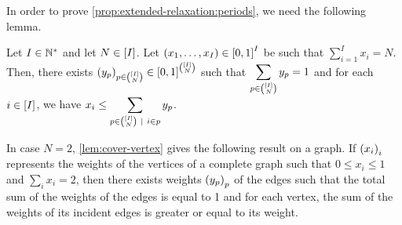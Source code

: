 In order to prove \cref{prop:extended-relaxation:periods}, we need the following lemma.


\begin{lem}\label{lem:cover-vertex}
Let $I\in\mathbb{N}^*$ and let $N\in\range{I}$.
Let $\bracket{x_1,\ldots,x_I}\in\sqbracket{0,1}^I$ be such that $\sum_{i=1}^I x_i = N$.
Then, there exists $\bracket{y_p}_{p\in{\range{I}\choose N}}\in\sqbracket{0,1}^{\range{I}\choose N}$ such that
$\ds\sum_{p\in{\range{I} \choose N}}y_p = 1$
and for each $i\in\range{I}$, we have
$\ds x_i \le \sum_{p\in{\range{I} \choose N}~|~i\in p}y_p$.
\end{lem}


\begin{rmq}
In case $N=2$, \cref{lem:cover-vertex} gives the following result on a graph.
If $\bracket{x_i}_i$ represents the weights of the vertices of a complete graph such that $0\le x_i\le1$ and $\sum_i x_i=2$,
then there exists weights $\bracket{y_p}_p$ of the edges such that the total sum of the weights of the edges is equal to 1 and for each vertex, the sum of the weights of its incident edges is greater or equal to its weight.
\end{rmq}


